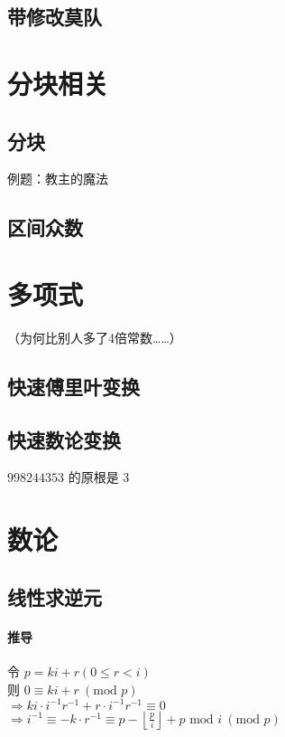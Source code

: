 \documentclass{article}
\begin{document}
		\subsection{带修改莫队}

	\newpage

	\section{分块相关}
		\subsection{分块}
		例题：教主的魔法
		
		\subsection{区间众数}

	\newpage
	\section{多项式}
		（为何比别人多了4倍常数……）
		\subsection{快速傅里叶变换}
		
		\subsection{快速数论变换}
		$998244353$ 的原根是 $3$
		
	\section{数论}
		\subsection{线性求逆元}
			\paragraph{推导}
			令 $p = ki + r (0 \le r < i)$ \\
			则 $0 \equiv ki + r \: (\text{mod } p)$ \\
			$\Rightarrow ki \cdot i^{-1} r^{-1} + r \cdot i^{-1} r^{-1} \equiv 0$ \\
			$\Rightarrow i^{-1} \equiv -k \cdot r^{-1} \equiv p - \left\lfloor \frac{p}{i}\right\rfloor + p \text{ mod } i \: ( \text{mod } p )$
			
\end{document}
